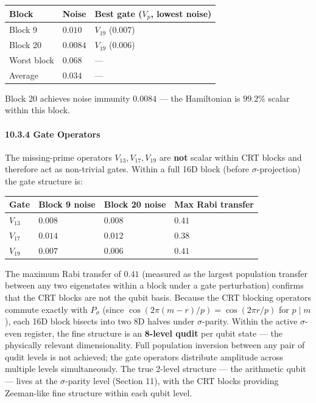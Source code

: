 \documentclass[11pt,letterpaper]{article}
\theoremstyle{definition}
\theoremstyle{remark}
\begin{document}
\begin{longtable}[]{@{}lll@{}}
\toprule
Block & Noise & Best gate ($V_p$, lowest noise) \\
\midrule
\endhead
\bottomrule
Block 9 & $0.010$ & $V_{19}$ ($0.007$) \\
Block 20 & $0.0084$ & $V_{19}$ ($0.006$) \\
Worst block & $0.068$ & --- \\
Average & $0.034$ & --- \\
\end{longtable}

Block 20 achieves noise immunity $0.0084$ --- the Hamiltonian is $99.2\%$ scalar within this block.

\paragraph{10.3.4 Gate Operators}\label{gate-operators}

The missing-prime operators $V_{13}, V_{17}, V_{19}$ are \textbf{not} scalar within CRT blocks and therefore act as non-trivial gates. Within a full 16D block (before $\sigma$-projection) the gate structure is:

\begin{longtable}[]{@{}llll@{}}
\toprule
Gate & Block 9 noise & Block 20 noise & Max Rabi transfer \\
\midrule
\endhead
\bottomrule
$V_{13}$ & $0.008$ & $0.008$ & $0.41$ \\
$V_{17}$ & $0.014$ & $0.012$ & $0.38$ \\
$V_{19}$ & $0.007$ & $0.006$ & $0.41$ \\
\end{longtable}

The maximum Rabi transfer of $0.41$ (measured as the largest population transfer between any two eigenstates within a block under a gate perturbation) confirms that the CRT blocks are not the qubit basis. Because the CRT blocking operators commute exactly with $P_\sigma$ (since $\cos(2\pi(m-r)/p) = \cos(2\pi r/p)$ for $p \mid m$), each 16D block bisects into two 8D halves under $\sigma$-parity. Within the active $\sigma$-even register, the fine structure is an \textbf{8-level qudit} per qubit state --- the physically relevant dimensionality. Full population inversion between any pair of qudit levels is not achieved; the gate operators distribute amplitude across multiple levels simultaneously. The true 2-level structure --- the arithmetic qubit --- lives at the $\sigma$-parity level (Section 11), with the CRT blocks providing Zeeman-like fine structure within each qubit level.
\end{document}
